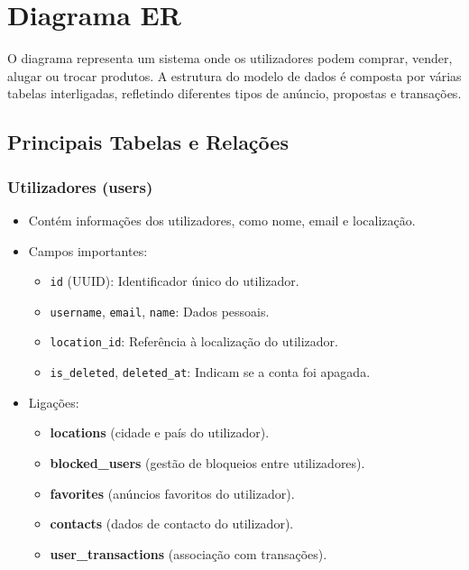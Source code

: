 \documentclass[a4paper, 12pt]{article} %
\begin{document}
\section*{Diagrama ER}

O diagrama representa um sistema onde os utilizadores podem comprar, vender, alugar ou trocar produtos. A estrutura do modelo de dados é composta por várias tabelas interligadas, refletindo diferentes tipos de anúncio, propostas e transações.




\subsection{\textbf{Principais Tabelas e Relações}}

\subsubsection{\textbf{Utilizadores (users)}}

\begin{itemize}
    \item Contém informações dos utilizadores, como nome, email e localização.
    \item Campos importantes:
    \begin{itemize}
        \item \verb|id| (UUID): Identificador único do utilizador.
        \item \verb|username|, \verb|email|, \verb|name|: Dados pessoais.
        \item \verb|location_id|: Referência à localização do utilizador.
        \item \verb|is_deleted|, \verb|deleted_at|: Indicam se a conta foi apagada.
    \end{itemize}
    \item Ligações:
    \begin{itemize}
        \item \textbf{locations} (cidade e país do utilizador).
        \item \textbf{blocked\_users} (gestão de bloqueios entre utilizadores).
        \item \textbf{favorites} (anúncios favoritos do utilizador).
        \item \textbf{contacts} (dados de contacto do utilizador).
        \item \textbf{user\_transactions} (associação com transações).
    \end{itemize}
\end{itemize}
\end{document}
